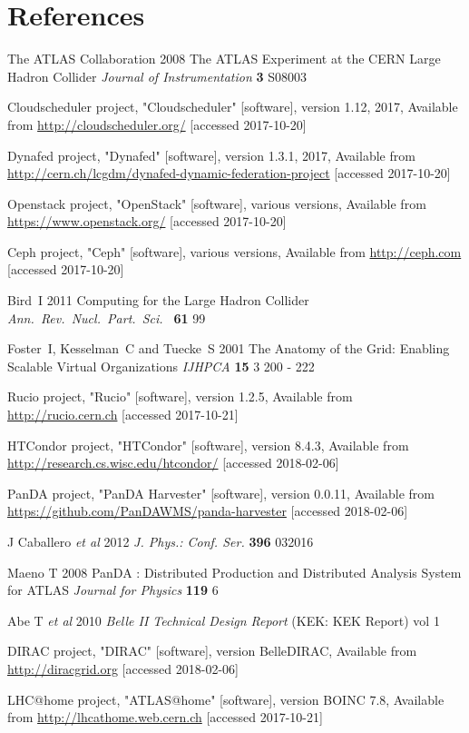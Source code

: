 \documentclass[a4paper]{jpconf}
\begin{document}
\section*{References}
\begin{thebibliography}{9}
  The ATLAS Collaboration 2008 The ATLAS Experiment at the CERN Large Hadron Collider
  {\it Journal of Instrumentation} {\bf 3} S08003

  Cloudscheduler project, "Cloudscheduler" [software], version 1.12, 2017, Available from \url{http://cloudscheduler.org/} [accessed 2017-10-20]

  Dynafed project, "Dynafed" [software], version 1.3.1, 2017, Available from \url{http://cern.ch/lcgdm/dynafed-dynamic-federation-project}  [accessed 2017-10-20]

  Openstack project, "OpenStack" [software], various versions, Available from \url{https://www.openstack.org/} [accessed 2017-10-20]

  Ceph project, "Ceph" [software], various versions, Available from \url{http://ceph.com} [accessed 2017-10-20]


  Bird~I
  2011
  Computing for the Large Hadron Collider
  {\it Ann.\ Rev.\ Nucl.\ Part.\ Sci.\ } {\bf 61} 99

  Foster~I, Kesselman~C and Tuecke~S
  2001
  The Anatomy of the Grid: Enabling Scalable Virtual Organizations
  {\it IJHPCA} {\bf 15} 3 200 - 222

  Rucio project, "Rucio" [software], version 1.2.5, Available from \url{http://rucio.cern.ch} [accessed 2017-10-21]

  HTCondor project, "HTCondor" [software], version 8.4.3, Available from \url{http://research.cs.wisc.edu/htcondor/} [accessed 2018-02-06]

  PanDA project, "PanDA Harvester" [software], version 0.0.11, Available from \url{https://github.com/PanDAWMS/panda-harvester} [accessed 2018-02-06]

  J Caballero {\it et al}
  2012
  {\it J. Phys.: Conf. Ser.} {\bf 396} 032016

  Maeno T
  2008
  PanDA : Distributed Production and Distributed Analysis System for ATLAS
  {\it Journal for Physics} {\bf 119} 6

  Abe T {\it et al}
  2010
  {\it Belle II Technical Design Report}
  (KEK: KEK Report) vol 1

  DIRAC project, "DIRAC" [software], version BelleDIRAC, Available from \url{http://diracgrid.org} [accessed 2018-02-06]

  LHC@home project, "ATLAS@home" [software], version BOINC 7.8, Available from \url{http://lhcathome.web.cern.ch} [accessed 2017-10-21]

\end{thebibliography}
\end{document}
